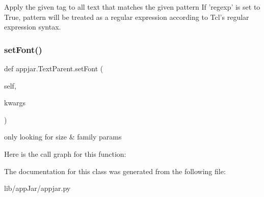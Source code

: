\begin{DoxyVerb}Apply the given tag to all text that matches the given pattern
If 'regexp' is set to True, pattern will be treated as a regular
expression according to Tcl's regular expression syntax.
\end{DoxyVerb}
 \mbox{\label{classappjar_1_1_text_parent_a1ea57f4cfec1f327e149849d7ac62630}} 
\subsubsection{\texorpdfstring{set\+Font()}{setFont()}}
{\footnotesize\ttfamily def appjar.\+Text\+Parent.\+set\+Font (\begin{DoxyParamCaption}\item[{}]{self,  }\item[{}]{kwargs }\end{DoxyParamCaption})}

\begin{DoxyVerb}only looking for size & family params \end{DoxyVerb}
 Here is the call graph for this function\+:


The documentation for this class was generated from the following file\+:\begin{DoxyCompactItemize}
\item 
lib/app\+Jar/appjar.\+py\end{DoxyCompactItemize}
